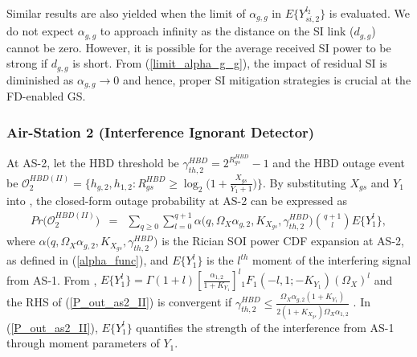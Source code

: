 
Similar results are also yielded when the limit of $\alpha_{g,g}$ in $E\{Y_{si,2}^{l_2}\}$ is evaluated. We do not expect $\alpha_{g,g}$ to approach infinity as the distance on the SI link ($d_{g,g}$) cannot be zero. However, it is possible for the average received SI power to be strong if $d_{g,g}$ is short. From (\ref{limit_alpha_g_g}), the impact of residual SI is diminished as $\alpha_{g,g} \to 0$ and hence, proper SI mitigation strategies is crucial at the FD-enabled GS. 

\subsubsection{Air-Station 2 (Interference Ignorant Detector)} \label{AS2_II_subsect}
At AS-2, let the HBD threshold be $\gamma_{th,2}^{HBD} = 2^{R_{gs}^{HBD}}-1$ and the HBD outage event be $\mathcal{O}_{2}^{HBD(II)}  = \Big\{ h_{g,2}, h_{1,2} : R_{gs}^{HBD} \geq \log_{2}\Big(1+\frac{X_{gs}}{Y_{1} + 1}\Big)\Big\}$. By substituting $X_{gs}$ and $Y_{1}$ into \cite[eq. (12)]{rached2017unified}, the closed-form outage probability at AS-2 can be expressed as
\begin{eqnarray} \label{P_out_as2_II}
Pr\big(\mathcal{O}_{2}^{HBD(II)}\big) & = & \sum_{q\geq0} \sum_{l=0}^{q+1} \alpha\big(q,\Omega_X \alpha_{g,2}, K_{X_{gs}}, \gamma_{th,2}^{HBD}\big) \binom{q+1}{l} E\{Y_1^l\},
\end{eqnarray}
where $\alpha\big(q,\Omega_X \alpha_{g,2}, K_{X_{gs}}, \gamma_{th,2}^{HBD}\big)$ is the Rician SOI power CDF expansion at AS-2, as defined in (\ref{alpha_func}), and $E\{Y_1^l\}$ is the $l^{th}$ moment of the interfering signal from AS-1. From \cite[Table II]{rached2017unified}, $E\{Y_1^l\} = \Gamma(1+l) \left[\frac{\alpha_{1,2}}{1+K_{Y_1}}\right]^{l} {}_1{F_1}(-l,1;-K_{Y_1}) (\Omega_X)^{l}$ and the RHS of (\ref{P_out_as2_II}) is convergent if $\gamma_{th,2}^{HBD} \leq \frac{\Omega_{X}\alpha_{g,2}(1+K_{Y_{1}})}{2(1+K_{X_{gs}})\Omega_X\alpha_{1,2}}$ \cite[eq. (14)]{rached2017unified}. In (\ref{P_out_as2_II}), $E\{Y_1^l\}$ quantifies the strength of the interference from AS-1 through moment parameters of $Y_1$. 

